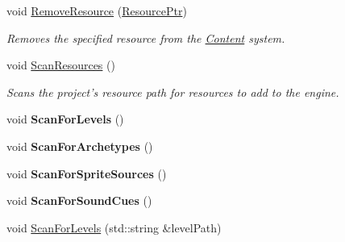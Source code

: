 \begin{DoxyCompactItemize}
\item 
void \hyperlink{classDCEngine_1_1Systems_1_1Content_a85636619434d7d8b6bea0266bccac31c}{Remove\-Resource} (\hyperlink{classDCEngine_1_1Resource}{Resource\-Ptr})
\begin{DoxyCompactList}\small\item\em Removes the specified resource from the \hyperlink{classDCEngine_1_1Systems_1_1Content}{Content} system. \end{DoxyCompactList}\item 
\hypertarget{classDCEngine_1_1Systems_1_1Content_a2c182c608f472d5d154d0a770c7f041f}{void \hyperlink{classDCEngine_1_1Systems_1_1Content_a2c182c608f472d5d154d0a770c7f041f}{Scan\-Resources} ()}\label{classDCEngine_1_1Systems_1_1Content_a2c182c608f472d5d154d0a770c7f041f}

\begin{DoxyCompactList}\small\item\em Scans the project's resource path for resources to add to the engine. \end{DoxyCompactList}\item 
\hypertarget{classDCEngine_1_1Systems_1_1Content_adf21f885586442b8e2ae40a87be93172}{void {\bfseries Scan\-For\-Levels} ()}\label{classDCEngine_1_1Systems_1_1Content_adf21f885586442b8e2ae40a87be93172}

\item 
\hypertarget{classDCEngine_1_1Systems_1_1Content_a29c58a6b10a1f9deaabc0e7aac4db1df}{void {\bfseries Scan\-For\-Archetypes} ()}\label{classDCEngine_1_1Systems_1_1Content_a29c58a6b10a1f9deaabc0e7aac4db1df}

\item 
\hypertarget{classDCEngine_1_1Systems_1_1Content_a06c842b8dbba90ba61ec66edc05eaedf}{void {\bfseries Scan\-For\-Sprite\-Sources} ()}\label{classDCEngine_1_1Systems_1_1Content_a06c842b8dbba90ba61ec66edc05eaedf}

\item 
\hypertarget{classDCEngine_1_1Systems_1_1Content_a0c44870abb43ae764b3c2c3ef0911942}{void {\bfseries Scan\-For\-Sound\-Cues} ()}\label{classDCEngine_1_1Systems_1_1Content_a0c44870abb43ae764b3c2c3ef0911942}

\item 
\hypertarget{classDCEngine_1_1Systems_1_1Content_a89d8da4859096cda973d6c4ad5636d57}{void \hyperlink{classDCEngine_1_1Systems_1_1Content_a89d8da4859096cda973d6c4ad5636d57}{Scan\-For\-Levels} (std\-::string \&level\-Path)}\label{classDCEngine_1_1Systems_1_1Content_a89d8da4859096cda973d6c4ad5636d57}


\end{DoxyCompactItemize}
